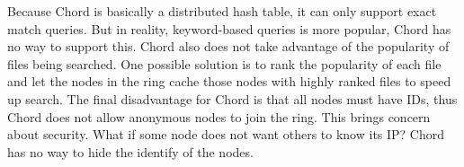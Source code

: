 \documentclass[11pt]{article}
\begin{document}
\vspace{1em}
Because Chord is basically a distributed hash table, it can only
support exact match queries. But in reality, keyword-based queries is
more popular, Chord has no way to support this. Chord also does not
take advantage of the popularity of files being searched. One
possible solution is to rank the popularity of each file and let the
nodes in the ring cache those nodes with highly ranked files to
speed up search. The final disadvantage for Chord is that all nodes
must have IDs, thus Chord does not allow anonymous nodes to join the
ring. This brings concern about security. What if some node does not
want others to know its IP? Chord has no way to hide the identify of
the nodes.
\end{document}
